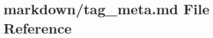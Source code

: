 \hypertarget{tag__meta_8md}{}\section{markdown/tag\+\_\+meta.md File Reference}
\label{tag__meta_8md}
